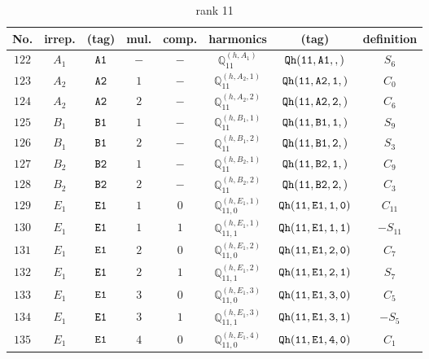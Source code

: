 \documentclass[fleqn,8pt]{jsarticle}
\begin{document}
\begin{table}[ht!]
\begin{center}
\caption{rank 11}
\renewcommand{\arraystretch}{1.3}
\begin{tabular}{cccccccc} \hline \hline
No. & irrep. & (tag) & mul. & comp. & harmonics & (tag) & definition \\ \hline
$ 122 $ & $ A_{1} $ & $ {\tt A1} $ & $ - $ & $ - $ & $ \mathbb{Q}_{11}^{(h,A_{1})} $ & $ {\tt Qh(11,A1,,)} $ & $ S_{6} $ \\
$ 123 $ & $ A_{2} $ & $ {\tt A2} $ & $ 1 $ & $ - $ & $ \mathbb{Q}_{11}^{(h,A_{2},1)} $ & $ {\tt Qh(11,A2,1,)} $ & $ C_{0} $ \\
$ 124 $ & $ A_{2} $ & $ {\tt A2} $ & $ 2 $ & $ - $ & $ \mathbb{Q}_{11}^{(h,A_{2},2)} $ & $ {\tt Qh(11,A2,2,)} $ & $ C_{6} $ \\
$ 125 $ & $ B_{1} $ & $ {\tt B1} $ & $ 1 $ & $ - $ & $ \mathbb{Q}_{11}^{(h,B_{1},1)} $ & $ {\tt Qh(11,B1,1,)} $ & $ S_{9} $ \\
$ 126 $ & $ B_{1} $ & $ {\tt B1} $ & $ 2 $ & $ - $ & $ \mathbb{Q}_{11}^{(h,B_{1},2)} $ & $ {\tt Qh(11,B1,2,)} $ & $ S_{3} $ \\
$ 127 $ & $ B_{2} $ & $ {\tt B2} $ & $ 1 $ & $ - $ & $ \mathbb{Q}_{11}^{(h,B_{2},1)} $ & $ {\tt Qh(11,B2,1,)} $ & $ C_{9} $ \\
$ 128 $ & $ B_{2} $ & $ {\tt B2} $ & $ 2 $ & $ - $ & $ \mathbb{Q}_{11}^{(h,B_{2},2)} $ & $ {\tt Qh(11,B2,2,)} $ & $ C_{3} $ \\
$ 129 $ & $ E_{1} $ & $ {\tt E1} $ & $ 1 $ & $ 0 $ & $ \mathbb{Q}_{11,0}^{(h,E_{1},1)} $ & $ {\tt Qh(11,E1,1,0)} $ & $ C_{11} $ \\
$ 130 $ & $ E_{1} $ & $ {\tt E1} $ & $ 1 $ & $ 1 $ & $ \mathbb{Q}_{11,1}^{(h,E_{1},1)} $ & $ {\tt Qh(11,E1,1,1)} $ & $ - S_{11} $ \\
$ 131 $ & $ E_{1} $ & $ {\tt E1} $ & $ 2 $ & $ 0 $ & $ \mathbb{Q}_{11,0}^{(h,E_{1},2)} $ & $ {\tt Qh(11,E1,2,0)} $ & $ C_{7} $ \\
$ 132 $ & $ E_{1} $ & $ {\tt E1} $ & $ 2 $ & $ 1 $ & $ \mathbb{Q}_{11,1}^{(h,E_{1},2)} $ & $ {\tt Qh(11,E1,2,1)} $ & $ S_{7} $ \\
$ 133 $ & $ E_{1} $ & $ {\tt E1} $ & $ 3 $ & $ 0 $ & $ \mathbb{Q}_{11,0}^{(h,E_{1},3)} $ & $ {\tt Qh(11,E1,3,0)} $ & $ C_{5} $ \\
$ 134 $ & $ E_{1} $ & $ {\tt E1} $ & $ 3 $ & $ 1 $ & $ \mathbb{Q}_{11,1}^{(h,E_{1},3)} $ & $ {\tt Qh(11,E1,3,1)} $ & $ - S_{5} $ \\
$ 135 $ & $ E_{1} $ & $ {\tt E1} $ & $ 4 $ & $ 0 $ & $ \mathbb{Q}_{11,0}^{(h,E_{1},4)} $ & $ {\tt Qh(11,E1,4,0)} $ & $ C_{1} $ \\

\end{tabular}
\end{center}
\end{table}
\end{document}

